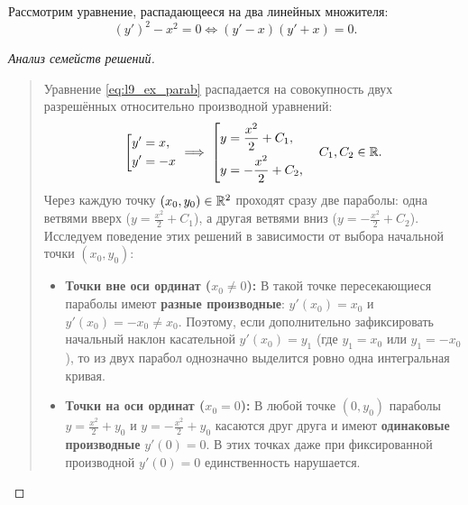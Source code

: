\begin{example}
    Рассмотрим уравнение, распадающееся на два линейных множителя:
    \begin{equation} \label{eq:l9_ex_parab}
        (y')^2 - x^2 = 0 \iff (y' - x)(y' + x) = 0. \tag{2}
    \end{equation}

    \begin{proof}[Анализ семейств решений]~\\
        \begin{quote}
            Уравнение \eqref{eq:l9_ex_parab} распадается на совокупность двух
            разрешённых относительно производной уравнений:
            \[
                \left[
                \begin{aligned}
                    y' &= x, \\
                    y' &= -x
                \end{aligned}
                \right.
                \implies
                \left[
                \begin{aligned}
                    y &= \frac{x^2}{2} + C_1, \\
                    y &= -\frac{x^2}{2} + C_2,
                \end{aligned}
                \right.
                \quad C_1, C_2 \in \mathbb{R}.
            \]
            Через каждую точку $(x_0, y_0) \in \mathbb{R}^2$ проходят сразу две
            параболы: одна ветвями вверх ($y = \frac{x^2}{2} + C_1$), а другая
            ветвями вниз ($y = -\frac{x^2}{2} + C_2$). Исследуем поведение
            этих решений в зависимости от выбора начальной точки $(x_0, y_0)$:
            \begin{itemize}
                \item \textbf{Точки вне оси ординат ($x_0 \neq 0$):} В такой
                точке пересекающиеся параболы имеют \textbf{разные производные}:
                $y'(x_0) = x_0$ и $y'(x_0) = -x_0 \neq x_0$. Поэтому, если
                дополнительно зафиксировать начальный наклон касательной
                $y'(x_0) = y_1$ (где $y_1 = x_0$ или $y_1 = -x_0$), то из двух
                парабол однозначно выделится ровно одна интегральная кривая.
                \item \textbf{Точки на оси ординат ($x_0 = 0$):} В любой точке
                $(0, y_0)$ параболы $y = \frac{x^2}{2} + y_0$ и
                $y = -\frac{x^2}{2} + y_0$ касаются друг друга и имеют
                \textbf{одинаковые производные} $y'(0) = 0$. В этих точках
                даже при фиксированной производной $y'(0) = 0$ единственность
                нарушается.
            \end{itemize}
        \end{quote}
    \end{proof}
\end{example}

